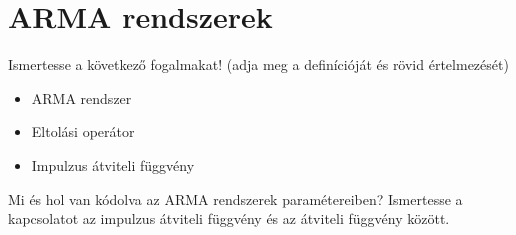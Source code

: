 \documentclass[../main.tex]{subfiles}
\begin{document}
\section{ARMA rendszerek}

\begin{fulltheorem}
	Ismertesse a következő fogalmakat!
	(adja meg a definícióját és rövid értelmezését)
	\begin{itemize}
		\item ARMA rendszer
		\item Eltolási operátor
		\item Impulzus átviteli függvény
	\end{itemize}
	Mi és hol van kódolva az ARMA rendszerek paramétereiben?
	Ismertesse a kapcsolatot az impulzus átviteli függvény és az átviteli függvény között.
\end{fulltheorem}
\end{document}
